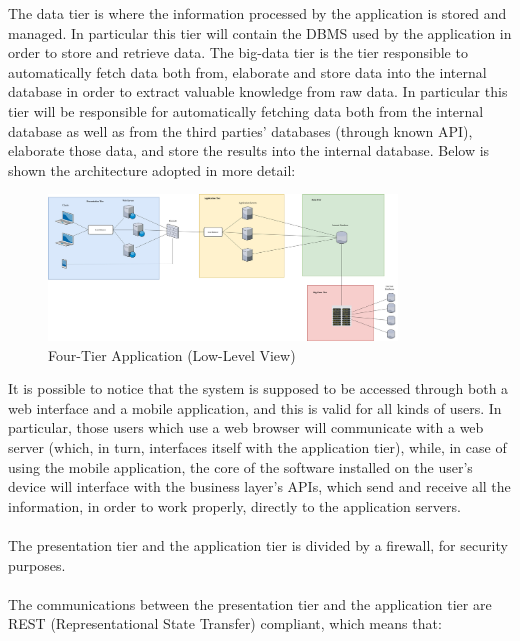 \documentclass[10pt]{report}
\begin{document}
\newline
\newline
The data tier is where the information processed by the application is stored and managed. In particular this tier will contain the DBMS used by the application in order to store and retrieve data.
\newline
\newline
The big-data tier is the tier responsible to automatically fetch data both from, elaborate and store data into the internal database in order to extract valuable knowledge from raw data. In particular this tier will be responsible for automatically fetching data both from the internal database as well as from the third parties' databases (through known API), elaborate those data, and store the results into the internal database.
\newline
\newline
Below is shown the architecture adopted in more detail:
\begin{figure}[H]
    \centering
    \includegraphics[width=350px]{Architecture/FourTiers_02.jpg}
    \caption{Four-Tier Application (Low-Level View)}
\end{figure}
It is possible to notice that the system is supposed to be accessed through both a web interface and a mobile application, and this is valid for all kinds of users. In particular, those users which use a web browser will communicate with a web server (which, in turn, interfaces itself with the application tier), while, in case of using the mobile application, the core of the software installed on the user’s device will interface with the business layer’s APIs, which send and receive all the information, in order to work properly, directly to the application servers.\\ \\ 
The presentation tier and the application tier is divided by a firewall, for security purposes.\\\ \\
The communications between the presentation tier and the application tier are REST (Representational State Transfer) compliant, which means that:
\end{document}

